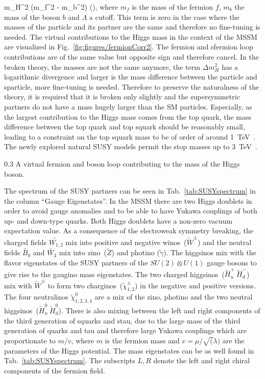 {
\Delta m_{H}^{2} \propto (m_{f}^{2} - m_{b}^2)  \left(\right),
}
where $m_{f}$ is the mass of the fermion $f$, $m_{b}$ the mass of the boson $b$ and $\Lambda$ a cutoff. This term is zero in the case where the masses of the particle and its partner are the same and therefore no fine-tuning is needed. The virtual contributions to the Higgs mass in the context of the MSSM are visualized in Fig.~\ref{fig:figures/fermionCorr2}. The fermion and sfermion loop contributions are of the same value but opposite sign and therefore cancel. In the broken theory, the masses are not the same anymore, the term $\Delta m_{H}^{2}$ has a logarithmic divergence and larger is the mass difference between the particle and sparticle, more fine-tuning is needed. Therefore to preserve the naturalness of the theory, it is required that it is broken only slightly and the supersymmetric partners do not have a mass hugely larger than the SM particles. Especially, as the largest  contribution to the Higgs mass comes from the top quark, the mass difference between the top quark and top squark should be reasonably small, leading to a constraint on the top squark mass to be of order of around 1~TeV~\cite{Barbieri:1987fn}. The newly explored natural SUSY models permit the stop masses up to 3~TeV~\cite{Baer:2016bwh}.

                 {0.3}       %
                 { A virtual fermion and boson loop contributing to the mass of the Higgs boson.}

The spectrum of the SUSY partners can be seen in Tab.~\ref{tab:SUSYspectrum} in the column ``Gauge Eigenstates''. In the MSSM there are two Higgs doublets in order to avoid gauge anomalies and to be able to have Yukawa couplings of both up- and down-type quarks. Both Higgs doublets have a non-zero vacuum expectation value. As a consequence of the electroweak symmetry breaking, the charged fields $\tilde{W_{1,2}}$ mix into positive and negative winos~($\tilde{W}^{\pm}$) and the neutral fields $\tilde{B_{0}}$ and $\tilde{W_{3}}$ mix into zino~($\tilde{Z}$) and photino ($\tilde{\gamma}$). The higgsinos mix with the flavor eigenstates of the SUSY partners of the $SU(2) \otimes U(1)$ gauge bosons to give rise to the gaugino mass eigenstates. The two charged higgsinos~($\tilde{H}_{u}^{+}~\tilde{H}_{d}^{-}$) mix with $\tilde{W}^{\pm}$ to form two charginos~($\tilde{\chi}_{1,2}^{\pm}$) in the negative and positive versions. The four neutralinos $\tilde{\chi}_{1,2,3,4}^{0}$ are a mix of the zino, photino and the two neutral higgsinos~($\tilde{H}_{u}^{0}~\tilde{H}_{d}^{0}$). There is also mixing between the left and right components of the third generation of squarks and stau, due to the large mass of the third generation of quarks and tau and therefore large Yukawa couplings which are proportionate to $m/v$, where $m$ is the fermion mass and $v = \mu/\sqrt(\lambda)$ are the parameters of the Higgs potential. The mass eigenstates can be as well found in Tab.~\ref{tab:SUSYspectrum}. The subscripts $L,R$ denote the left and right chiral components of the fermion field.

